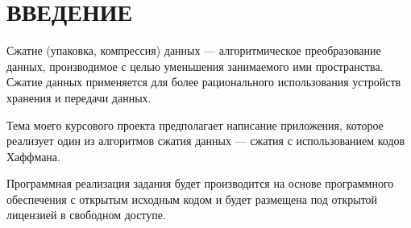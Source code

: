 \section*{ВВЕДЕНИЕ}

Сжатие (упаковка, компрессия) данных --- алгоритмическое преобразование данных,
производимое с целью уменьшения занимаемого ими пространства.
Сжатие данных применяется для более рационального использования 
устройств хранения и передачи данных.

Тема моего курсового проекта предполагает написание приложения,
которое реализует один из алгоритмов сжатия данных
--- сжатия с использованием кодов Хаффмана.

Программная реализация задания будет производится на основе программного 
обеспечения с открытым исходным кодом и будет размещена под открытой
лицензией в свободном доступе.
